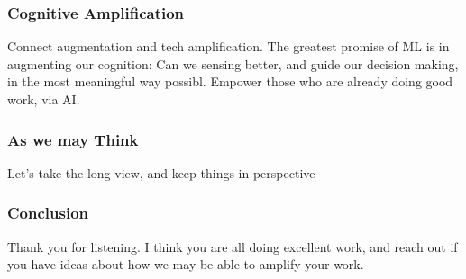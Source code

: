 \documentclass[10pt,mathserif]{beamer}
\begin{document}
\begin{frame}
  \frametitle{Cognitive Amplification}
  Connect augmentation and tech amplification.
  The greatest promise of ML is in augmenting our cognition: Can we sensing
  better, and guide our decision making, in the most meaningful way possibl.
  Empower those who are already doing good work, via AI.
\end{frame}

\begin{frame}
  \frametitle{As we may Think}
  Let's take the long view, and keep things in perspective
\end{frame}

\begin{frame}
  \frametitle{Conclusion}
  Thank you for listening. I think you are all doing excellent work, and reach
  out if you have ideas about how we may be able to amplify your work.
\end{frame}



\end{document}
